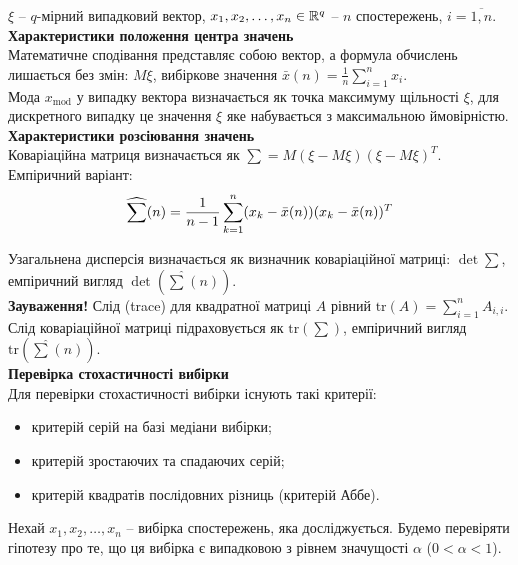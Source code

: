 $\xi$ -- $q$-мірний випадковий вектор, $x_1, x_2, \ldots, x_n \in \mathbb{R}^q$ -- $n$ спостережень, $i=\overline{1,n}$. \\

\textbf{Характеристики положення центра значень} \\

Математичне сподівання представляє собою вектор, а формула обчислень лишається без змін: $M\xi$, вибіркове значення $\bar{x}(n) = \frac{1}{n} \sum_{i=1}^n x_i$. \\

Мода $x_{\text{mod}}$ у випадку вектора визначається як точка максимуму щільності $\xi$, для дискретного випадку це значення $\xi$ яке набувається з максимальною ймовірністю. \\

\textbf{Характеристики розсіювання значень} \\

Коваріаційна матриця визначається як $\sum = M (\xi - M \xi) (\xi - M \xi)^T$. Емпіричний варіант: 
\[ \widehat{\displaystyle\sum\limits}(n) = \dfrac{1}{n-1} \displaystyle\sum\limits_{k=1}^n (x_k - \bar{x}(n)) (x_k - \bar{x}(n))^T \] 

Узагальнена дисперсія визначається як визначник коваріаційної матриці: $\det \sum$, емпіричний вигляд $\det (\widehat{\sum}(n))$. \\

\textbf{Зауваження!} Слід (trace) для квадратної матриці $A$ рівний $\text{tr} (A) = \sum_{i=1}^n A_{i,i}$. \\

Слід коваріаційної матриці підраховується як $\text{tr} \left(\sum\right)$, емпіричний вигляд $\text{tr} \left(\widehat{\sum}(n)\right)$. \\

\textbf{Перевірка стохастичності вибірки} \\

Для перевірки стохастичності вибірки існують такі критерії:
\begin{itemize}
    \item критерій серій на базі медіани вибірки;
    
    \item критерій зростаючих та спадаючих серій;
    
    \item критерій квадратів послідовних різниць (критерій Аббе).
\end{itemize}

Нехай $x_1, x_2, \ldots, x_n$ -- вибірка спостережень, яка досліджується. Будемо перевіряти гіпотезу про те, що ця вибірка є випадковою з рівнем значущості $\alpha$ ($0 < \alpha < 1$). \\

